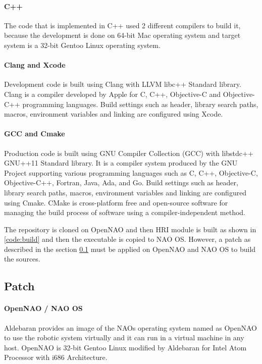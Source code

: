 \paragraph*{C++} The code that is implemented in C++ used 2 different compilers to build it, because the development is done on 64-bit Mac operating system and target system is a 32-bit Gentoo Linux operating system. 

\paragraph*{\indent Clang and Xcode} Development code is built using Clang with LLVM libc++ Standard library. Clang is a compiler developed by Apple for C, C++, Objective-C and Objective-C++ programming languages. Build settings such as header, library search paths, macros, environment variables and linking are configured using Xcode. 

\paragraph*{\indent GCC and Cmake} Production code is built using GNU Compiler Collection (GCC) with libstdc++ GNU++11 Standard library. It is a compiler system produced by the GNU Project supporting various programming languages such as C, C++, Objective-C, Objective-C++, Fortran, Java, Ada, and Go. Build settings such as header, library search paths, macros, environment variables and linking are configured using Cmake. CMake is cross-platform free and open-source software for managing the build process of software using a compiler-independent method. 

The repository is cloned on OpenNAO and then HRI module is built as shown in \ref{code:build} and then the executable is copied to NAO OS. However, a patch as described in the section \ref{sec:patch} must be applied on OpenNAO and NAO OS to build the sources.

 \label{code:build}

\subsection{Patch} \label{sec:patch} 
\paragraph*{OpenNAO / NAO OS} Aldebaran provides an image of the NAOs operating system named as OpenNAO to use the robotic system virtually and it can run in a virtual machine in any host. OpenNAO is 32-bit Gentoo Linux modified by Aldebaran for Intel Atom Processor with i686 Architecture. 

